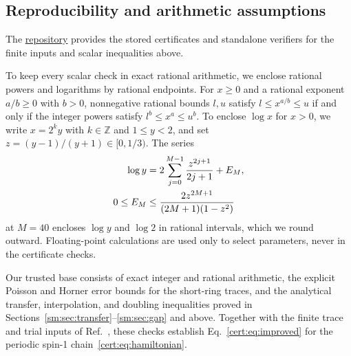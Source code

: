 \subsection{Reproducibility and arithmetic assumptions}
\label{cert:sec:reproduce}

The \href{https://github.com/LionSR/CertifiedGaps}{repository} provides
the stored certificates and standalone verifiers for the finite inputs and
scalar inequalities above.

To keep every scalar check in exact rational arithmetic, we enclose
rational powers and logarithms by rational endpoints. For $x\ge0$ and a
rational exponent $a/b\ge0$ with $b>0$, nonnegative rational bounds $l,u$
satisfy $l\le x^{a/b}\le u$ if and only if the integer powers satisfy
$l^b\le x^a\le u^b$. To enclose $\log x$ for $x>0$, we write $x=2^ky$ with
$k\in\mathbb Z$ and $1\le y<2$, and set $z=(y-1)/(y+1)\in[0,1/3)$. The
series
\begin{align}
 \log y&=2\sum_{j=0}^{M-1}\frac{z^{2j+1}}{2j+1}+E_M,\notag \\
 0\le E_M&\le
 \frac{2z^{2M+1}}{(2M+1)(1-z^2)}
 \label{cert:eq:log-enclosure}
\end{align}
at $M=40$ encloses $\log y$ and $\log2$ in rational intervals, which we
round outward. Floating-point calculations are used only to select
parameters, never in the certificate checks.

Our trusted base consists of exact integer and rational arithmetic, the
explicit Poisson and Horner error bounds for the short-ring traces, and
the analytical transfer, interpolation, and doubling inequalities proved
in Sections~\ref{sm:sec:transfer}--\ref{sm:sec:gap} and above. Together
with the finite trace and trial inputs of Ref.~\cite{OpenAI2026Periodic},
these checks establish Eq.~\eqref{cert:eq:improved} for the periodic
spin-1 chain~\eqref{cert:eq:hamiltonian}.
